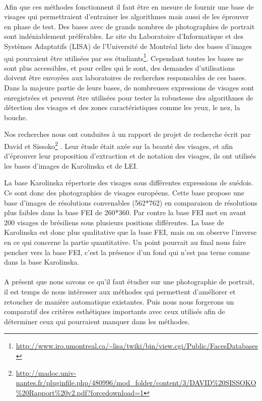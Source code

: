 \documentclass[11pt, french]{report-rd-info}
\begin{document}
\paragraph*{}
Afin que ces méthodes fonctionnent il faut être en mesure de fournir une base de visages qui permettraient d’entrainer les algorithmes mais aussi de les éprouver en phase de test. 
Des bases avec de grands nombres de photographies de portrait sont indéniablement préférables. Le site du Laboratoire d'Informatique et des Systèmes Adaptatifs (LISA) de l'Université de Montréal liste des bases d'images qui pourraient être utilisées par ses étudiants\footnote{\url{http://www.iro.umontreal.ca/~lisa/twiki/bin/view.cgi/Public/FacesDatabases}}. Cependant toutes les bases ne sont plus accessibles, et pour celles qui le sont, des demandes d'utilisations doivent être envoyées aux laboratoires de recherches responsables de ces bases. Dans la majeure partie de leurs bases, de nombreuses expressions de visages sont enregistrées et peuvent être utilisées pour tester la robustesse des algorithmes de détection des visages et des zones caractéristiques comme les yeux, le nez, la bouche.

Nos recherches nous ont conduites à un rapport de projet de recherche écrit par David et Sissoko\footnote{\url{http://madoc.univ-nantes.fr/pluginfile.php/480996/mod_folder/content/3/DAVID\%20SISSOKO\%20Rapport\%20v2.pdf?forcedownload=1}} . Leur étude était axée sur la beauté des visages, et afin d'éprouver leur proposition d'extraction et de notation des visages, ils ont utilisés les bases d'images de Karolinska et de LEI.

La base Karolinska répertorie des visages sous différentes expressions de suédois. Ce sont donc des photographies de visages européens. Cette base propose une base d'images de résolutions convenables (562*762) en comparaison de résolutions plus faibles dans la base FEI de 260*360. Par contre la base FEI met en avant 200 visages de brésiliens sous plusieurs positions différentes. La base de Karolinska est donc plus qualitative que la base FEI, mais on on observe l'inverse en ce qui concerne la partie quantitative. Un point pourrait au final nous faire pencher vers la base FEI, c'est la présence d'un fond qui n'est pas terne comme dans la base Karolinska.

\paragraph*{}
A présent que nous savons ce qu'il faut étudier sur une photographie de portrait, il est temps de nous intéresser aux méthodes qui permettent d'améliorer et retoucher de manière automatique existantes. Puis nous nous forgerons un comparatif des critères esthétiques importants avec ceux utilisés afin de déterminer ceux qui pourraient manquer dans les méthodes.
\end{document}
